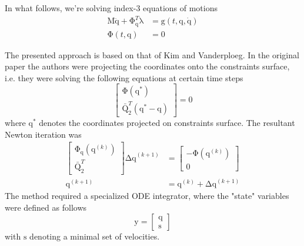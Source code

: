 \documentclass{scrartcl}
\newcommand\mMat[1]{\ensuremath{\boldsymbol{\mathrm{#1}}}}
\newcommand\mVec[1]{\ensuremath{\boldsymbol{\mathrm{#1}}}}
\newcommand\mOf[1]{\left({#1}\right)}
\begin{document}
In what follows, we're solving index-3 equations of motions
\begin{subequations}
  \begin{align}
    \mMat{M} \mVec{\ddot q} + \mMat{\Phi}_{\mVec{q}}^T \mVec{\lambda}
      & = \mVec{g}\mOf{t,\mVec{q},\mVec{\dot q}}
    \\
    \mVec{\Phi}\mOf{t,\mVec{q}}
      &= \mVec{0}
  \end{align}
\end{subequations}

The presented approach is based on that of Kim and Vanderploeg. In the original
paper the authors were projecting the coordinates onto the constraints surface,
i.e. they were solving the following equations at certain time steps
\begin{equation}
  \begin{bmatrix}
    \mVec{\Phi} \mOf{\mVec{q}^{*}} \\
    \mMat{\bar Q}_2^T \left(\mVec{q}^{*} - \mVec{q} \right)
  \end{bmatrix}
  = \mVec{0}
  \label{eq:K1EVE}
\end{equation}
where $\mVec{q}^{*}$ denotes the coordinates projected on constraints surface.
The resultant Newton iteration was
\begin{subequations}
\label{eq:V5C00}
\begin{align}
  \label{eq:RI0GP}
  \begin{bmatrix}
    \mMat{\Phi}_{\mVec{q}}\mOf{\mVec{q}^{(k)}} \\
    \mMat{\bar Q}_2^T
  \end{bmatrix}
  \mVec{\Delta q}^{(k+1)}
  & = \begin{bmatrix}
    - \mVec{\Phi}\mOf{\mVec{q}^{(k)}} \\
    \mVec{0}
  \end{bmatrix}
  \\
  \label{eq:YMYOR}
  \mVec{q}^{(k+1)} & = \mVec{q}^{(k)} + \mVec{\Delta q}^{(k+1)}
\end{align}
\end{subequations}
The method required a specialized ODE integrator, where the "state" variables
were defined as follows
\begin{equation}
  \mVec{y} = \begin{bmatrix}
    \mVec{q} \\ \mVec{s}
  \end{bmatrix}
\end{equation}
with $\mVec{s}$ denoting a minimal set of velocities.
\end{document}
